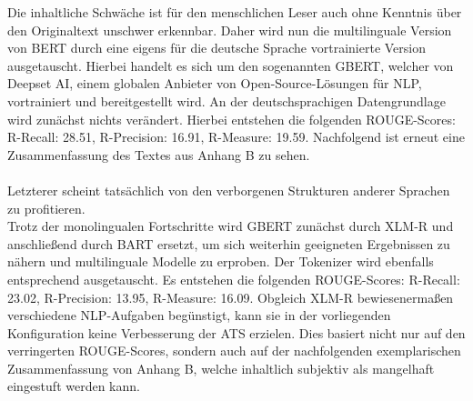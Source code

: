 \noindent{}
\newline

\noindent
Die inhaltliche Schwäche ist für den menschlichen Leser auch ohne Kenntnis über den Originaltext unschwer erkennbar. Daher wird nun die multilinguale Version von \ac{BERT} durch eine eigens für die deutsche Sprache vortrainierte Version ausgetauscht. Hierbei handelt es sich um den sogenannten \ac{GBERT}, welcher von Deepset AI, einem globalen Anbieter von Open-Source-Lösungen für \ac{NLP}, vortrainiert und bereitgestellt wird. An der deutschsprachigen Datengrundlage wird zunächst nichts verändert. Hierbei entstehen die folgenden \ac{ROUGE}-Scores: R-Recall: 28.51, R-Precision: 16.91, R-Measure: 19.59. Nachfolgend ist erneut eine Zusammenfassung des Textes aus Anhang B zu sehen.\\

\noindent{}\\




Letzterer scheint tatsächlich von den verborgenen Strukturen anderer Sprachen zu profitieren.\\


\noindent
Trotz der monolingualen Fortschritte wird \ac{GBERT} zunächst durch \ac{XLM-R} und anschließend durch \ac{BART} ersetzt, um sich weiterhin geeigneten Ergebnissen zu nähern und multilinguale Modelle zu erproben. Der Tokenizer wird ebenfalls entsprechend ausgetauscht. Es entstehen die folgenden \ac{ROUGE}-Scores: R-Recall: 23.02, R-Precision: 13.95, R-Measure: 16.09. Obgleich \ac{XLM-R} bewiesenermaßen verschiedene \ac{NLP}-Aufgaben begünstigt, kann sie in der vorliegenden Konfiguration keine Verbesserung der \ac{ATS} erzielen. Dies basiert nicht nur auf den verringerten \ac{ROUGE}-Scores, sondern auch auf der nachfolgenden exemplarischen Zusammenfassung von Anhang B, welche inhaltlich subjektiv als mangelhaft eingestuft werden kann.\\

